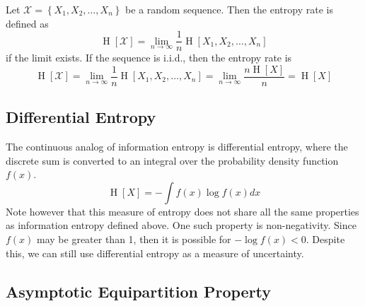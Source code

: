 \documentclass[11pt]{report} %
\begin{document}
Let $\mathcal{X} = \left\{X_{1}, X_{2}, \dots, X_{n}\right\}$ be a random sequence. Then the entropy rate is defined as
\begin{equation}
\operatorname{H}\left[\mathcal{X}\right] = \lim_{n\to\infty}\dfrac{1}{n}\operatorname{H}\left[X_{1}, X_{2}, \dots, X_{n}\right]
\end{equation}
if the limit exists. If the sequence is i.i.d., then the entropy rate is
\begin{equation}
\operatorname{H}\left[\mathcal{X}\right] = \lim_{n\to\infty}\dfrac{1}{n}\operatorname{H}\left[X_{1}, X_{2}, \dots, X_{n}\right] = \lim_{n\to\infty}\dfrac{n\operatorname{H}\left[X\right]}{n} = \operatorname{H}\left[X\right]
\end{equation}

\subsection{Differential Entropy}

The continuous analog of information entropy is differential entropy, where the discrete sum is converted to an integral over the probability density function $f\left(x\right)$.
\begin{equation}
\operatorname{H}\left[X\right] = -\int f\left(x\right)\log f\left(x\right) dx
\end{equation}
Note however that this measure of entropy does not share all the same properties as information entropy defined above. One such property is non-negativity. Since $f\left(x\right)$ may be greater than 1, then it is possible for $-\log f\left(x\right) < 0$. Despite this, we can still use differential entropy as a measure of uncertainty.

\subsection{Asymptotic Equipartition Property}
\end{document}
